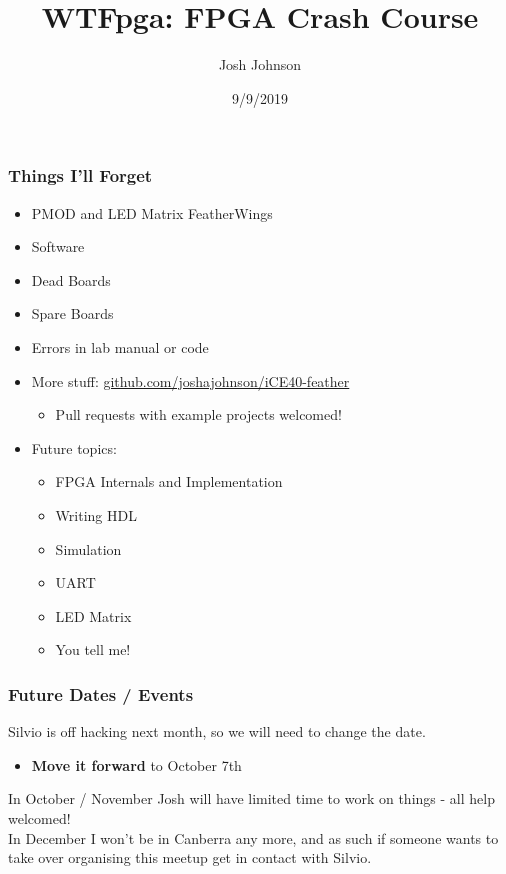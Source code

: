 \documentclass[t]{beamer}
\title[WTFpga]{WTFpga: FPGA Crash Course} %
\author{Josh Johnson} %
\institute[] %
{ \\ %
\medskip
\textit{} %
}
\date{9/9/2019} %
\begin{document}
\begin{frame}
\titlepage %
\end{frame}


\begin{frame}
\frametitle{Things I'll Forget}
\begin{itemize}
	\item PMOD and LED Matrix FeatherWings 
	\item Software
	\item Dead Boards
	\item Spare Boards
	\item Errors in lab manual or code
	\item More stuff: \url{github.com/joshajohnson/iCE40-feather}
	\begin{itemize}
		\item Pull requests with example projects welcomed!
	\end{itemize}
	\item Future topics:
	\begin{itemize}
		\item FPGA Internals and Implementation
		\item Writing HDL 
		\item Simulation
		\item UART
		\item LED Matrix
		\item You tell me!
	\end{itemize}
\end{itemize}
\end{frame}


\begin{frame}
\frametitle{Future Dates / Events}
Silvio is off hacking next month, so we will need to change the date.
\begin{itemize}
	\item \textbf{Move it forward} to October 7th
\end{itemize}

\vspace{5mm}
In October / November Josh will have limited time to work on things - all help welcomed!\\[10pt]


In December I won't be in Canberra any more, and as such if someone wants to take over organising this meetup get in contact with Silvio.
\end{frame}
\end{document}
